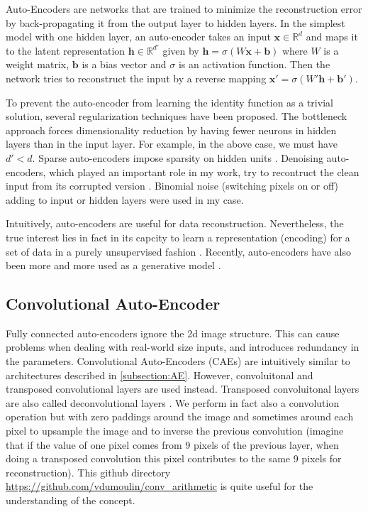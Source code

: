 Auto-Encoders are networks that are trained to minimize the reconstruction
error by back-propagating it from the output layer to hidden layers.
In the simplest model with one hidden layer, an auto-encoder takes an
input $\mathbf{x} \in \mathbb{R}^d$ and maps it to the latent
representation $\mathbf{h} \in \mathbb{R}^{d'}$ given by
$\mathbf{h} = \sigma(W\mathbf{x}+\mathbf{b})$ where $W$
is a weight matrix, $\mathbf{b}$ is a bias vector and $\sigma$ is an
activation function. Then the network tries to reconstruct the input
by a reverse mapping $\mathbf{x'} = \sigma(W'\mathbf{h}+\mathbf{b'})$.

To prevent the auto-encoder from learning the identity function as
a trivial solution, several regularization techniques have been proposed.
The bottleneck approach forces dimensionality reduction by having
fewer neurons in hidden layers than in the input layer. For example,
in the above case, we must have $d'<d$. Sparse auto-encoders impose sparsity
on hidden units \cite{A. Makhzani 2014}.
Denoising auto-encoders, which played an important role in my work,
try to recontruct the clean input from its corrupted version
\cite{P. Vincent 2008, Y. Bengio 2012}. Binomial noise
(switching pixels on or off) adding
to input or hidden layers were used in my case.

Intuitively, auto-encoders are useful for data reconstruction.
Nevertheless, the true interest lies in fact in its capcity to learn
a representation (encoding) for a set of data in a purely unsupervised
fashion \cite{P. Vincent 2010}. Recently, auto-encoders have also
been more and more used as a generative model \cite{Y. Bengio 2013}.

\subsection{Convolutional Auto-Encoder}

Fully connected auto-encoders ignore the 2d image structure.
This can cause problems when dealing with real-world size inputs,
and introduces redundancy in the parameters.
Convolutional Auto-Encoders \cite{J. Masci 2011, V. Turchenko 2017}
(CAEs) are intuitively similar
to architectures described in \ref{subsection:AE}.
However, convoluitonal and transposed convolutional layers are used instead.
Transposed convoluitonal layers are also called deconvolutional
layers \cite{M. D. Zeiler 2011}.
We perform in fact also a convolution operation but with zero paddings
around the image and sometimes around each pixel to upsample the
image and to inverse the previous convolution
(imagine that if the value of one pixel comes from 9 pixels of the
previous layer, when doing a transposed convolution this pixel
contributes to the same 9 pixels for reconstruction).
This github directory
\href{https://github.com/vdumoulin/conv_arithmetic}
{https://github.com/vdumoulin/conv\_arithmetic}
is quite useful for the understanding of the concept.

